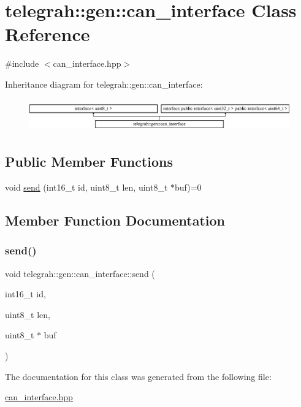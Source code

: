 \hypertarget{classtelegrah_1_1gen_1_1can__interface}{}\section{telegrah\+:\+:gen\+:\+:can\+\_\+interface Class Reference}
\label{classtelegrah_1_1gen_1_1can__interface}


{\ttfamily \#include $<$can\+\_\+interface.\+hpp$>$}

Inheritance diagram for telegrah\+:\+:gen\+:\+:can\+\_\+interface\+:\begin{figure}[H]
\begin{center}
\leavevmode
\includegraphics[height=1.421320cm]{classtelegrah_1_1gen_1_1can__interface}
\end{center}
\end{figure}
\subsection*{Public Member Functions}
\begin{DoxyCompactItemize}
\item 
void \hyperlink{classtelegrah_1_1gen_1_1can__interface_a86b5cb1f63f8287500a4245a7fb1d5cc}{send} (int16\+\_\+t id, uint8\+\_\+t len, uint8\+\_\+t $\ast$buf)=0
\end{DoxyCompactItemize}


\subsection{Member Function Documentation}
\mbox{\label{classtelegrah_1_1gen_1_1can__interface_a86b5cb1f63f8287500a4245a7fb1d5cc}} 
\subsubsection{\texorpdfstring{send()}{send()}}
{\footnotesize\ttfamily void telegrah\+::gen\+::can\+\_\+interface\+::send (\begin{DoxyParamCaption}\item[{int16\+\_\+t}]{id,  }\item[{uint8\+\_\+t}]{len,  }\item[{uint8\+\_\+t $\ast$}]{buf }\end{DoxyParamCaption})\hspace{0.3cm}{\ttfamily [pure virtual]}}



The documentation for this class was generated from the following file\+:\begin{DoxyCompactItemize}
\item 
\hyperlink{can__interface_8hpp}{can\+\_\+interface.\+hpp}\end{DoxyCompactItemize}
